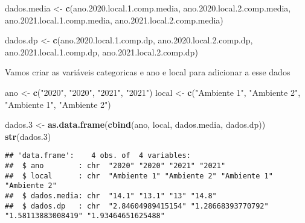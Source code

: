\documentclass[]{book}
\newenvironment{Shaded}{\begin{snugshade}}{\end{snugshade}}
\newcommand{\FloatTok}[1]{\textcolor[rgb]{0.00,0.00,0.81}{#1}}
\newcommand{\KeywordTok}[1]{\textcolor[rgb]{0.13,0.29,0.53}{\textbf{#1}}}
\newcommand{\NormalTok}[1]{#1}
\newcommand{\StringTok}[1]{\textcolor[rgb]{0.31,0.60,0.02}{#1}}
\begin{document}
\begin{Shaded}
\begin{Highlighting}[]
\NormalTok{dados.media <-}\StringTok{ }\KeywordTok{c}\NormalTok{(ano.}\FloatTok{2020.}\NormalTok{local.}\FloatTok{1.}\NormalTok{comp.media,}
\NormalTok{                 ano.}\FloatTok{2020.}\NormalTok{local.}\FloatTok{2.}\NormalTok{comp.media,}
\NormalTok{                 ano.}\FloatTok{2021.}\NormalTok{local.}\FloatTok{1.}\NormalTok{comp.media,}
\NormalTok{                 ano.}\FloatTok{2021.}\NormalTok{local.}\FloatTok{2.}\NormalTok{comp.media)}

\NormalTok{dados.dp <-}\StringTok{ }\KeywordTok{c}\NormalTok{(ano.}\FloatTok{2020.}\NormalTok{local.}\FloatTok{1.}\NormalTok{comp.dp,}
\NormalTok{              ano.}\FloatTok{2020.}\NormalTok{local.}\FloatTok{2.}\NormalTok{comp.dp,}
\NormalTok{              ano.}\FloatTok{2021.}\NormalTok{local.}\FloatTok{1.}\NormalTok{comp.dp,}
\NormalTok{              ano.}\FloatTok{2021.}\NormalTok{local.}\FloatTok{2.}\NormalTok{comp.dp)}
\end{Highlighting}
\end{Shaded}

Vamos criar as variáveis categoricas e ano e local para adicionar a esse dados

\begin{Shaded}
\begin{Highlighting}[]
\NormalTok{ano <-}\StringTok{ }\KeywordTok{c}\NormalTok{(}\StringTok{"2020"}\NormalTok{, }\StringTok{"2020"}\NormalTok{, }\StringTok{"2021"}\NormalTok{, }\StringTok{"2021"}\NormalTok{)}
\NormalTok{local <-}\StringTok{ }\KeywordTok{c}\NormalTok{(}\StringTok{"Ambiente 1"}\NormalTok{, }\StringTok{"Ambiente 2"}\NormalTok{, }\StringTok{"Ambiente 1"}\NormalTok{, }\StringTok{"Ambiente 2"}\NormalTok{)}

\NormalTok{dados}\FloatTok{.3}\NormalTok{ <-}\StringTok{ }\KeywordTok{as.data.frame}\NormalTok{(}\KeywordTok{cbind}\NormalTok{(ano, local, dados.media, dados.dp))}
\KeywordTok{str}\NormalTok{(dados}\FloatTok{.3}\NormalTok{)}
\end{Highlighting}
\end{Shaded}

\begin{verbatim}
## 'data.frame':    4 obs. of  4 variables:
##  $ ano        : chr  "2020" "2020" "2021" "2021"
##  $ local      : chr  "Ambiente 1" "Ambiente 2" "Ambiente 1" "Ambiente 2"
##  $ dados.media: chr  "14.1" "13.1" "13" "14.8"
##  $ dados.dp   : chr  "2.84604989415154" "1.28668393770792" "1.58113883008419" "1.93464651625488"
\end{verbatim}
\end{document}
